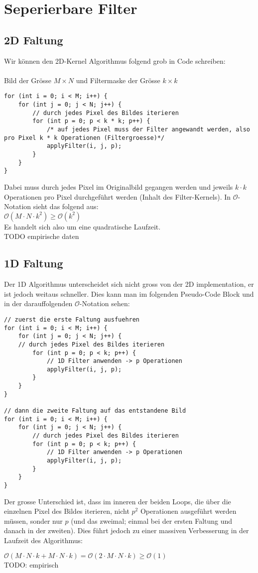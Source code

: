 \documentclass{article} %
\begin{document}
\section{Seperierbare Filter}
\subsection{2D Faltung}

Wir können den 2D-Kernel Algorithmus folgend grob in Code schreiben:\\ \\
Bild der Grösse $M \times N$ und Filtermaske der Grösse $k \times k$

\begin{lstlisting}
for (int i = 0; i < M; i++) {
	for (int j = 0; j < N; j++) {
		// durch jedes Pixel des Bildes iterieren
		for (int p = 0; p < k * k; p++) {
			/* auf jedes Pixel muss der Filter angewandt werden, also pro Pixel k * k Operationen (Filtergroesse)*/
			applyFilter(i, j, p);
		}
	}
}
\end{lstlisting}

Dabei muss durch jedes Pixel im Originalbild gegangen werden und jeweils $k \cdot k$ Operationen pro Pixel durchgeführt werden (Inhalt des Filter-Kernels). In $\mathcal{O}$-Notation sieht das folgend aus: \\
$\mathcal{O} (M \cdot N \cdot k^2) \geq \mathcal{O}(k^2)$ \\
Es handelt sich also um eine quadratische Laufzeit.\\
TODO empirische daten

\subsection{1D Faltung}

Der 1D Algorithmus unterscheidet sich nicht gross von der 2D implementation, er ist jedoch weitaus schneller. Dies kann man im folgenden Pseudo-Code Block und in der darauffolgenden $\mathcal{O}$-Notation sehen:

\begin{lstlisting}
// zuerst die erste Faltung ausfuehren
for (int i = 0; i < M; i++) {
	for (int j = 0; j < N; j++) {
	// durch jedes Pixel des Bildes iterieren
		for (int p = 0; p < k; p++) {
			// 1D Filter anwenden -> p Operationen
			applyFilter(i, j, p);
		}
	}
}

// dann die zweite Faltung auf das entstandene Bild
for (int i = 0; i < M; i++) {
	for (int j = 0; j < N; j++) {
		// durch jedes Pixel des Bildes iterieren
		for (int p = 0; p < k; p++) {
			// 1D Filter anwenden -> p Operationen
			applyFilter(i, j, p);
		}
	}
}
\end{lstlisting}

Der grosse Unterschied ist, dass im inneren der beiden Loops, die über die einzelnen Pixel des Bildes iterieren, nicht $p^2$ Operationen ausgeführt werden müssen, sonder nur $p$ (und das zweimal; einmal bei der ersten Faltung und danach in der zweiten). Dies führt jedoch zu einer massiven Verbesserung in der Laufzeit des Algorithmus:

$\mathcal{O} (M \cdot N \cdot k + M \cdot N \cdot k) = \mathcal{O}(2 \cdot M \cdot N \cdot k) \geq \mathcal{O} (1)$ \\
TODO: empirisch
\end{document}
